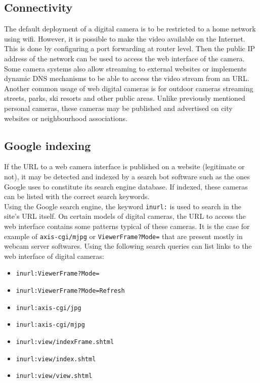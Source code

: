 \subsection{Connectivity}
\label{sec:cam-connect}

The default deployment of a digital camera is to be restricted to a home network using wifi.
However, it is possible to make the video available on the Internet.
This is done by configuring a port forwarding at router level.
Then the public IP address of the network can be used to access the web interface of the camera.
Some camera systems also allow streaming to external websites or implements dynamic DNS mechanisms to be able to access the video stream from an URL.\\

Another common usage of web digital cameras is for outdoor cameras streaming streets, parks, ski resorts and other public areas.
Unlike previously mentioned personal cameras, these cameras may be published and advertised on city websites or neighbourhood associations.

\subsection{Google indexing}

If the URL to a web camera interface is published on a website (legitimate or not), it may be detected and indexed by a search bot software such as the ones Google uses to constitute its search engine database.
If indexed, these cameras can be listed with the correct search keywords.\\

Using the Google search engine, the keyword \texttt{inurl:} is used to search in the site's URL itself.
On certain models of digital cameras, the URL to access the web interface contains some patterns typical of these cameras.
It is the case for example of \texttt{axis-cgi/mjpg} or \texttt{ViewerFrame?Mode=} that are present mostly in webcam server softwares.
Using the following search queries can list links to the web interface of digital cameras:

\begin{itemize}
\item \texttt{inurl:ViewerFrame?Mode=}
\item \texttt{inurl:ViewerFrame?Mode=Refresh}
\item \texttt{inurl:axis-cgi/jpg}
\item \texttt{inurl:axis-cgi/mjpg}
\item \texttt{inurl:view/indexFrame.shtml}
\item \texttt{inurl:view/index.shtml}
\item \texttt{inurl:view/view.shtml}
\end{itemize}

